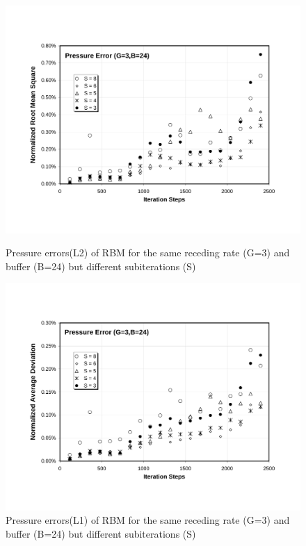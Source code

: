 \cp

\begin{figure}[htbp]
  \begin{center}    \includegraphics[scale=0.6]{../figures/Exp3-CASE1-dt0.005/G_3_B_24/G3-B24-P-NRMS.pdf}
    \caption{Pressure errors(L2) of RBM for the same receding rate (G=3) and buffer (B=24) but different subiterations (S)}
        \vspace{0.5in}        \includegraphics[scale=0.6]{../figures/Exp3-CASE1-dt0.005/G_3_B_24/G3-B24-P-NAD.pdf}
    \caption{Pressure errors(L1) of RBM for the same receding rate (G=3) and buffer (B=24) but different subiterations (S)}
  \end{center}
\end{figure}

